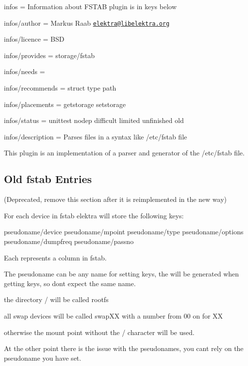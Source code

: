 
\begin{DoxyItemize}
\item infos = Information about F\+S\+T\+AB plugin is in keys below
\item infos/author = Markus Raab \href{mailto:elektra@libelektra.org}{\tt elektra@libelektra.\+org}
\item infos/licence = B\+SD
\item infos/provides = storage/fstab
\item infos/needs =
\item infos/recommends = struct type path
\item infos/placements = getstorage setstorage
\item infos/status = unittest nodep difficult limited unfinished old
\item infos/description = Parses files in a syntax like /etc/fstab file
\end{DoxyItemize}

This plugin is an implementation of a parser and generator of the /etc/fstab file.

\subsection*{Old fstab Entries}

(Deprecated, remove this section after it is reimplemented in the new way)

For each device in fstab elektra will store the following keys\+:


\begin{DoxyCode}
pseudoname/device
pseudoname/mpoint
pseudoname/type
pseudoname/options
pseudoname/dumpfreq
pseudoname/passno
\end{DoxyCode}


Each represents a column in fstab.

The pseudoname can be any name for setting keys, the will be generated when getting keys, so don\textquotesingle{}t expect the same name.

the directory {\ttfamily /} will be called {\ttfamily rootfs}

all swap devices will be called {\ttfamily swap\+XX} with a number from 00 on for XX

otherwise the mount point without the \textquotesingle{}/\textquotesingle{} character will be used.

At the other point there is the issue with the pseudonames, you can\textquotesingle{}t rely on the pseudoname you have set.

